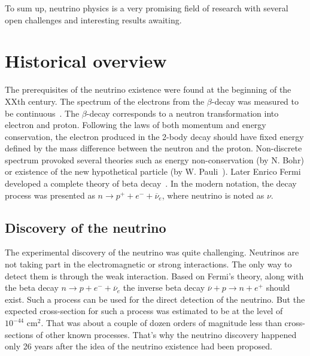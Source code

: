 \documentclass[../main.tex]{subfiles}
\begin{document}
To sum up, neutrino physics is a very promising field of research with several open challenges and interesting results awaiting.

\section{Historical overview}
\label{sec:hist}
The prerequisites of the neutrino existence were found at the beginning of the XXth century. The spectrum of the electrons from the $\beta$-decay was measured to be continuous~\cite{Chadwick1914}. The $\beta$-decay corresponds to a neutron transformation into electron and proton. Following the laws of both momentum and energy conservation, the electron produced in the 2-body decay should have fixed energy defined by the mass difference between the neutron and the proton. Non-discrete spectrum provoked several theories such as energy non-conservation (by N. Bohr) or existence of the new hypothetical particle (by W. Pauli~\cite{Pauli1930}). Later Enrico Fermi developed a complete theory of beta decay~\cite{Fermi1934}. In the modern notation, the decay process was presented as $n\to p^++e^-+\overline{\nu}_e$, where neutrino is noted as $\nu$.

\subsection{Discovery of the neutrino}
The experimental discovery of the neutrino was quite challenging. Neutrinos are not taking part in the electromagnetic or strong interactions. The only way to detect them is through the weak interaction. Based on Fermi's theory, along with the beta decay $n\to p+e^-+\overline{\nu}_e$ the inverse beta decay $\overline{\nu}+p\to n+e^+$ should exist. Such a process can be used for the direct detection of the neutrino. But the expected cross-section for such a process was estimated to be at the level of $10^{-44} \text{ cm}^2$. That was about a couple of dozen orders of magnitude less than cross-sections of other known processes. That's why the neutrino discovery happened only 26 years after the idea of the neutrino existence had been proposed.
\end{document}

